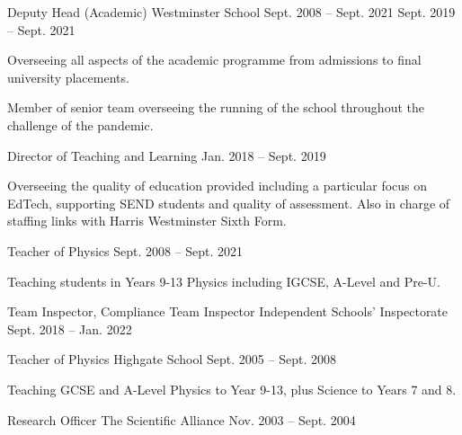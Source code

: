 \documentclass[11pt, a4paper]{awesome-cv}
\begin{document}
\begin{cventries}

    \cventry
      {Deputy Head (Academic)} %
      {Westminster School} %
      {Sept. 2008 -- Sept. 2021} %
      {Sept. 2019 -- Sept. 2021} %
      {
        \begin{cvitems} %
          \item {Overseeing all aspects of the academic programme from admissions to final university placements.}
          \item {Member of senior team overseeing the running of the school throughout the challenge of the pandemic.}
        \end{cvitems}
      }

    \cventry
      {Director of Teaching and Learning} %
      {} %
      {} %
      {Jan. 2018 -- Sept. 2019} %
      {
        \begin{cvitems} %
          \item {Overseeing the quality of education provided including a particular focus on EdTech, supporting SEND students and quality of assessment. Also in charge of staffing links with Harris Westminster Sixth Form.}
        \end{cvitems}
      }

    \cventry
      {Teacher of Physics} %
      {} %
      {} %
      {Sept. 2008 -- Sept. 2021} %
      {
        \begin{cvitems} %
          \item {Teaching students in Years 9-13 Physics including IGCSE, A-Level and Pre-U.}
        \end{cvitems}
      }

    \cventry
    {Team Inspector, Compliance Team Inspector} %
    {Independent Schools’ Inspectorate} %
    {Sept. 2018 -- Jan. 2022} %
    {} %
    {
    }

    \cventry
    {Teacher of Physics} %
    {Highgate School} %
    {Sept. 2005 -- Sept. 2008} %
    {} %
    {
      \begin{cvitems} %
        \item {Teaching GCSE and A-Level Physics to Year 9-13, plus Science to Years 7 and 8.}
      \end{cvitems}
    }

    \cventry
    {Research Officer} %
    {The Scientific Alliance} %
    {Nov. 2003 -- Sept. 2004} %
    {} %
    {}

\end{cventries}
\newpage
\end{document}
